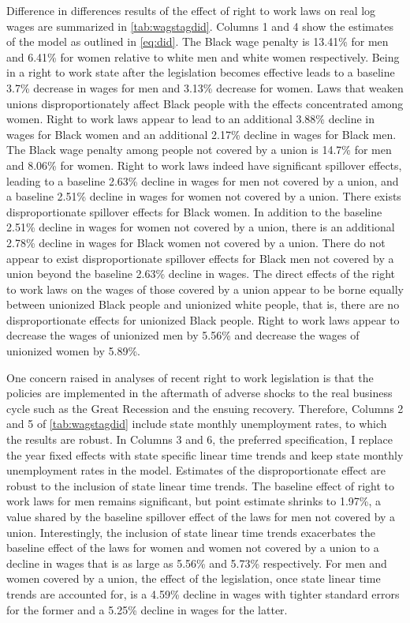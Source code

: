 \documentclass[11pt]{article}
\begin{document}
Difference in differences results of the effect of right to work laws on real log wages are summarized in \autoref{tab:wagstagdid}. Columns 1 and 4 show the estimates of the model as outlined in \autoref{eq:did}. The Black wage penalty is 13.41\% for men and 6.41\% for women relative to white men and white women respectively. Being in a right to work state after the legislation becomes effective leads to a baseline 3.7\% decrease in wages for men and 3.13\% decrease for women. Laws that weaken unions disproportionately affect Black people with the effects concentrated among women. Right to work laws appear to lead to an additional 3.88\% decline in wages for Black women and an additional 2.17\% decline in wages for Black men. The Black wage penalty among people not covered by a union is 14.7\% for men and 8.06\% for women. Right to work laws indeed have significant spillover effects, leading to a baseline 2.63\% decline in wages for men not covered by a union, and a baseline 2.51\% decline in wages for women not covered by a union. There exists disproportionate spillover effects for Black women. In addition to the baseline 2.51\% decline in wages for women not covered by a union, there is an additional 2.78\% decline in wages for Black women not covered by a union. There do not appear to exist disproportionate spillover effects for Black men not covered by a union beyond the baseline 2.63\% decline in wages. The direct effects of the right to work laws on the wages of those covered by a union appear to be borne equally between unionized Black people and unionized white people, that is, there are no disproportionate effects for unionized Black people. Right to work laws appear to decrease the wages of unionized men by 5.56\% and decrease the wages of unionized women by 5.89\%.

One concern raised in analyses of recent right to work legislation is that the policies are implemented in the aftermath of adverse shocks to the real business cycle such as the Great Recession and the ensuing recovery. Therefore, Columns 2 and 5 of \autoref{tab:wagstagdid} include state monthly unemployment rates, to which the results are robust. In Columns 3 and 6, the preferred specification, I replace the year fixed effects with state specific linear time trends and keep state monthly unemployment rates in the model. Estimates of the disproportionate effect are robust to the inclusion of state linear time trends. The baseline effect of right to work laws for men remains significant, but point estimate shrinks to 1.97\%, a value shared by the baseline spillover effect of the laws for men not covered by a union. Interestingly, the inclusion of state linear time trends exacerbates the baseline effect of the laws for women and women not covered by a union to a decline in wages that is as large as 5.56\% and 5.73\% respectively. For men and women covered by a union, the effect of the legislation, once state linear time trends are accounted for, is a 4.59\% decline in wages with tighter standard errors for the former and a 5.25\% decline in wages for the latter.
\end{document}
